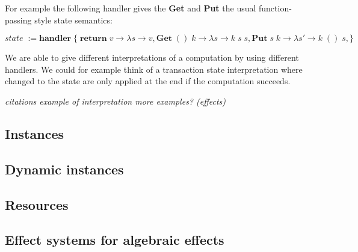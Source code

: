 For example the following handler gives the \textbf{Get} and \textbf{Put} the usual function-passing style state semantics:

\[ \textit{state} \; := \textbf{handler} \; \{ \;
  \textbf{return} \; v \rightarrow \lambda s \rightarrow v,
  \textbf{Get} \; () \; k \rightarrow \lambda s \rightarrow k \; s \; s,
  \textbf{Put} \; s \; k \rightarrow \lambda s' \rightarrow k \; () \; s,
\} \]

We are able to give different interpretations of a computation by using different handlers.
We could for example think of a transaction state interpretation where changed to the state are only applied at the end if the computation succeeds.

\textit{
citations
example of interpretation
more examples? (effects)
}

\subsection{Instances}
\subsection{Dynamic instances}
\subsection{Resources}
\subsection{Effect systems for algebraic effects}
